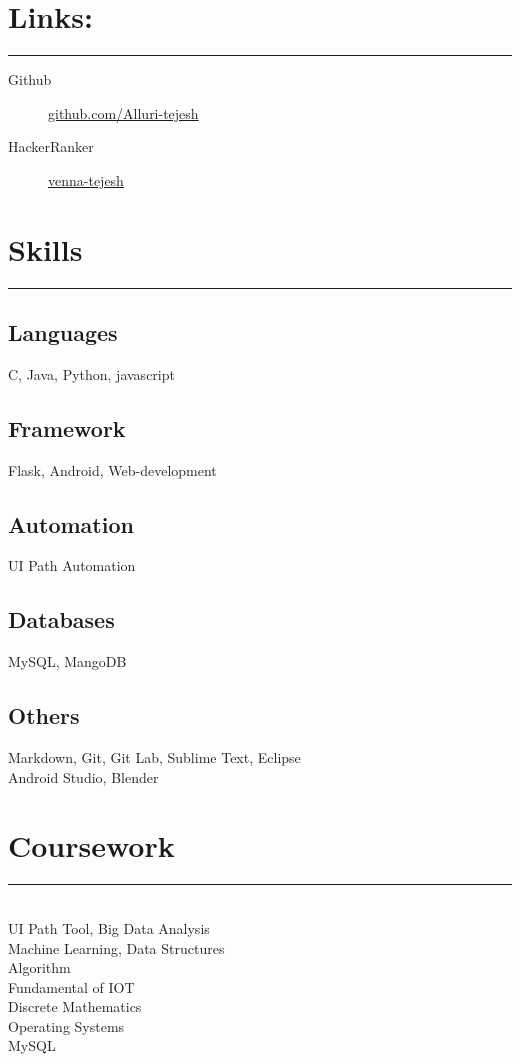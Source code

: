\documentclass[a4paper]{article}
\begin{document}
\begin{multicols}{2}

\section*{Links:}
\vspace{-15pt}
\rule{5cm}{0.4pt}
\begin{description}
\item[Github]  {\href{https://github.com/Alluri-tejesh}{github.com/Alluri-tejesh}}
\item[HackerRanker] {\href{https://www.hackerrank.com/venna_tejesh}{venna-tejesh}} 

 \end{description}
\section*{Skills}

\vspace{-15pt}
\rule{5cm}{0.4pt}

\subsection*{Languages}
C, Java, Python, javascript
\vspace{0.9pt}
\subsection*{Framework}
Flask, Android, Web-development
\vspace{0.9pt}
\subsection*{Automation}
UI Path Automation
\vspace{0.9pt}
\subsection*{Databases}
MySQL, MangoDB
\vspace{0.9pt}
\subsection*{Others}
Markdown, Git, Git Lab, Sublime Text, Eclipse\\
Android Studio, Blender
\section*{Coursework}
\vspace{-15pt}
\rule{5cm}{0.4pt}\\
\noindent UI Path Tool, Big Data Analysis\\
Machine Learning, Data Structures\\
Algorithm\\
Fundamental of IOT\\
Discrete Mathematics\\
Operating Systems\\
MySQL\\
\vspace{-15pt}

\end{multicols}
\end{document}
